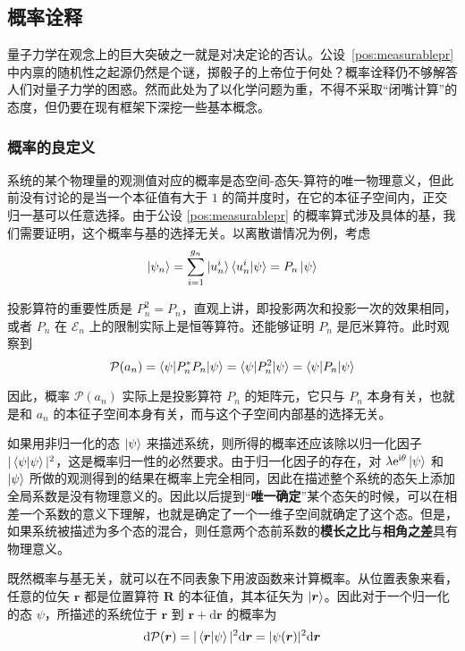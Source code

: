 \documentclass[cn,10pt,math=newtx,citestyle=gb7714-2015,bibstyle=gb7714-2015]{elegantbook}
\def\bm{\boldsymbol}
\def\ms{\mathscr}
\def\d{\mathrm d}
\def\i{\mathrm i}
\def\P{\mathcal P}
\begin{document}
\subsection{概率诠释}

量子力学在观念上的巨大突破之一就是对决定论的否认。公设~\ref{pos:measurablepr} 中内禀的随机性之起源仍然是个谜，掷骰子的上帝位于何处？概率诠释仍不够解答人们对量子力学的困惑。然而此处为了以化学问题为重，不得不采取“闭嘴计算”的态度，但仍要在现有框架下深挖一些基本概念。

\subsubsection{概率的良定义}
系统的某个物理量的观测值对应的概率是态空间-态矢-算符的唯一物理意义，但此前没有讨论的是当一个本征值有大于 $1$ 的简并度时，在它的本征子空间内，正交归一基可以任意选择。由于公设 \ref{pos:measurablepr} 的概率算式涉及具体的基，我们需要证明，这个概率与基的选择无关。以离散谱情况为例，考虑
\begin{equation}
    \ket{\psi_n}=\sum_{i=1}^{g_n}\ket{u_n^i}\braket{u_n^i|\psi}=P_n\ket{\psi}
\end{equation}

投影算符的重要性质是 $P_n^2=P_n$，直观上讲，即投影两次和投影一次的效果相同，或者 $P_n$ 在 $\ms E_n$ 上的限制实际上是恒等算符。还能够证明 $P_n$ 是厄米算符。此时观察到
\begin{equation}
    \P(a_n)=\braket{\psi|P_n^*P_n|\psi}=\braket{\psi|P_n^2|\psi}=\braket{\psi|P_n|\psi}
\end{equation}

因此，概率 $\P(a_n)$ 实际上是投影算符 $P_n$ 的矩阵元，它只与 $P_n$ 本身有关，也就是和 $a_n$ 的本征子空间本身有关，而与这个子空间内部基的选择无关。

如果用非归一化的态 $\ket{\psi}$ 来描述系统，则所得的概率还应该除以归一化因子 $|\braket{\psi|\psi}|^2$，这是概率归一性的必然要求。由于归一化因子的存在，对 $\lambda\text e^{\i\theta}\ket{\psi}$ 和 $\ket{\psi}$ 所做的观测得到的结果在概率上完全相同，因此在描述整个系统的态矢上添加全局系数是没有物理意义的。因此以后提到“\textbf{唯一确定}”某个态矢的时候，可以在相差一个系数的意义下理解，也就是确定了一个一维子空间就确定了这个态。但是，如果系统被描述为多个态的混合，则任意两个态前系数的\textbf{模长之比}与\textbf{相角之差}具有物理意义。

既然概率与基无关，就可以在不同表象下用波函数来计算概率。从位置表象来看，任意的位矢 $\bm r$ 都是位置算符 $\bm R$ 的本征值，其本征矢为 $\ket{\bm r}$。因此对于一个归一化的态 $\psi$，所描述的系统位于 $\bm r$ 到 $\bm r+\d\bm r$ 的概率为
\begin{equation}
    \d\P(\bm r)=|\braket{\bm r|\psi}|^2\d\bm r=|\psi(\bm r)|^2\d\bm r
\end{equation}
\end{document}
